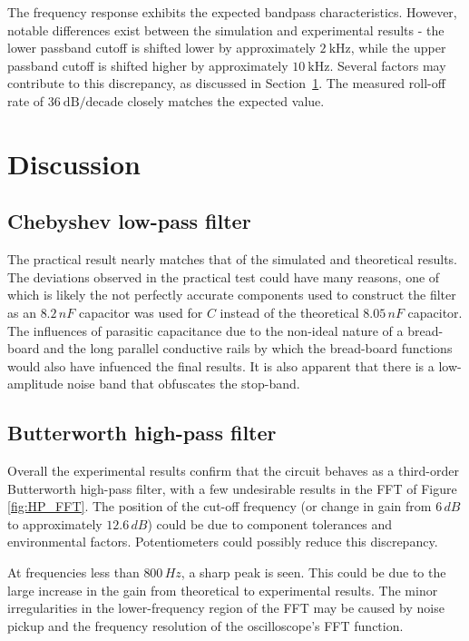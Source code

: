 \documentclass[a4paper, onecolumn, 12pt]{IEEEtran}
\begin{document}
The frequency response exhibits the expected bandpass characteristics. However, notable differences exist between the simulation and experimental results - the lower passband cutoff is shifted lower by approximately $2~\text{kHz}$, while the upper passband cutoff is shifted higher by approximately $10~\text{kHz}$. Several factors may contribute to this discrepancy, as discussed in Section~\ref{sec:discussion}. The measured roll-off rate of $36~\text{dB/decade}$ closely matches the expected value.

\newpage
\section{Discussion}
\label{sec:discussion}

\subsection{Chebyshev low-pass filter}
The practical result nearly matches that of the simulated and theoretical results. The deviations observed in the practical test could have many reasons, one of which is likely the not perfectly accurate components used to construct the filter as an $8.2\,nF$ capacitor was used for $C$ instead of the theoretical $8.05\,nF$ capacitor. The influences of parasitic capacitance due to the non-ideal nature of a bread-board and the long parallel conductive rails by which the bread-board functions would also have infuenced the final results. It is also apparent that there is a low-amplitude noise band that obfuscates the stop-band.


\subsection{Butterworth high-pass filter}
Overall the experimental results confirm that the circuit behaves as a third-order Butterworth high-pass filter, with a few undesirable results in the FFT of Figure \ref{fig:HP_FFT}. The position of the cut-off frequency (or change in gain from $6\,dB$ to approximately $12.6\,dB$) could be due to component tolerances and environmental factors. Potentiometers could possibly reduce this discrepancy. 

At frequencies less than $800\,Hz$, a sharp peak is seen. This could be due to the large increase in the gain from theoretical to experimental results. The minor irregularities in the lower-frequency region of the FFT may be caused by noise pickup and the frequency resolution of the oscilloscope's FFT function.
\end{document}
